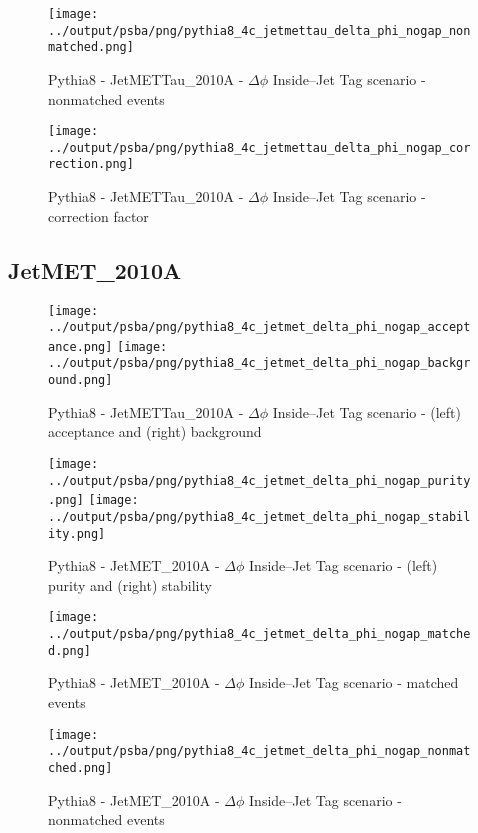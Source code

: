 \documentclass[11pt]{book}
\begin{document}
\begin{figure}[ht]
\centering
\texttt{[image: ../output/psba/png/pythia8\_4c\_jetmettau\_delta\_phi\_nogap\_nonmatched.png]}
\caption{Pythia8 - JetMETTau\_2010A - $\Delta\phi$ Inside--Jet Tag scenario - nonmatched events}
\label{fig:p8_jetmettau_delta_phi_nogap_nonmatched}
\end{figure}

\begin{figure}[ht]
\centering
\texttt{[image: ../output/psba/png/pythia8\_4c\_jetmettau\_delta\_phi\_nogap\_correction.png]}
\caption{Pythia8 - JetMETTau\_2010A - $\Delta\phi$ Inside--Jet Tag scenario - correction factor}
\label{fig:p8_jetmettau_delta_phi_nogap_correction}
\end{figure}



\clearpage
\subsection{JetMET\_2010A}

\begin{figure}[ht]
\centering
\texttt{[image: ../output/psba/png/pythia8\_4c\_jetmet\_delta\_phi\_nogap\_acceptance.png]}
\texttt{[image: ../output/psba/png/pythia8\_4c\_jetmet\_delta\_phi\_nogap\_background.png]}
\caption{Pythia8 - JetMETTau\_2010A - $\Delta\phi$ Inside--Jet Tag scenario - (left) acceptance and (right) background}
\label{fig:p8_jetmettau_delta_phi_nogap_ab}
\end{figure}

\begin{figure}[ht]
\centering
\texttt{[image: ../output/psba/png/pythia8\_4c\_jetmet\_delta\_phi\_nogap\_purity.png]}
\texttt{[image: ../output/psba/png/pythia8\_4c\_jetmet\_delta\_phi\_nogap\_stability.png]}
\caption{Pythia8 - JetMET\_2010A - $\Delta\phi$ Inside--Jet Tag scenario - (left) purity and (right) stability}
\label{fig:p8_jetmet_delta_phi_nogap_ps}
\end{figure}

\begin{figure}[ht]
\centering
\texttt{[image: ../output/psba/png/pythia8\_4c\_jetmet\_delta\_phi\_nogap\_matched.png]}
\caption{Pythia8 - JetMET\_2010A - $\Delta\phi$ Inside--Jet Tag scenario - matched events}
\label{fig:p8_jetmet_delta_phi_nogap_matched}
\end{figure}

\begin{figure}[ht]
\centering
\texttt{[image: ../output/psba/png/pythia8\_4c\_jetmet\_delta\_phi\_nogap\_nonmatched.png]}
\caption{Pythia8 - JetMET\_2010A - $\Delta\phi$ Inside--Jet Tag scenario - nonmatched events}
\label{fig:p8_jetmet_delta_phi_nogap_nonmatched}
\end{figure}
\end{document}
